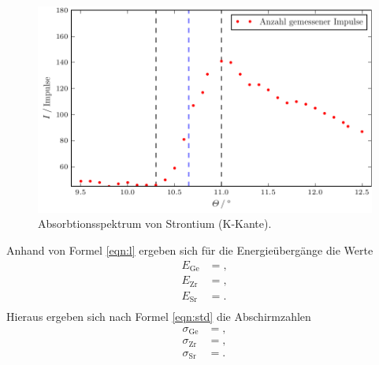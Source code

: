 \begin{figure}
  \centering
  \includegraphics{build/plot_sr.pdf}
  \caption{Absorbtionsspektrum von Strontium (K-Kante).}
  \label{fig:plot6}
\end{figure}

Anhand von Formel \eqref{eqn:l} ergeben sich für die Energieübergänge die Werte
\begin{align*}
  E_\text{Ge} &= , \\
  E_\text{Zr} &= , \\
  E_\text{Sr} &= . \\
\end{align*}
Hieraus ergeben sich nach Formel \eqref{eqn:std} die Abschirmzahlen
\begin{align*}
  \sigma_\text{Ge} &= , \\
  \sigma_\text{Zr} &= , \\
  \sigma_\text{Sr} &= . \\
\end{align*}


